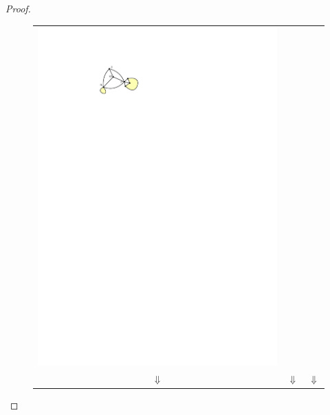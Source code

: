 \documentclass{article}
\theoremstyle{definition}
\begin{document}
\begin{proof}
\begin{figure}
\begin{tabular}{ccc}
      \includegraphics[page=7]{figs/degree_zero_killer} \\
      $\Downarrow$ & $\Downarrow$ & $\Downarrow$  \\

\end{tabular}
\end{figure}
\end{proof}
\end{document}

